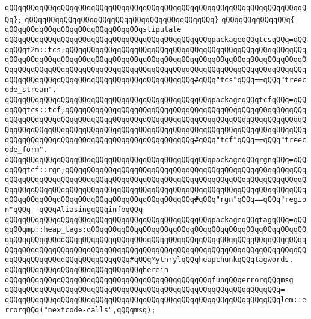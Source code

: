 \verb|qQQqqQQqqQQqqQQqqQQqqQQqqQQqqQQqqQQqqQQqqQQqqQQqqQQqqQQqqQQqqQQqqQQqqQQq};|\newline
\verb|qQQqqQQqqQQqqQQqqQQqqQQqqQQqqQQqqQQqqQQqqQQq}|\newline
\verb|qQQqqQQqqQQqqQQq{|\newline
\newline
\verb|qQQqqQQqqQQqqQQqqQQqqQQqqQQqqQQqstipulate|\newline
\verb|qQQqqQQqqQQqqQQqqQQqqQQqqQQqqQQqqQQqqQQqqQQqqQQqpackageqQQqtcsqQQq=qQQqqQQqt2m::tcs;qQQqqQQqqQQqqQQqqQQqqQQqqQQqqQQqqQQqqQQqqQQqqQQqqQQqqQQqqQQqqQQqqQQqqQQqqQQqqQQqqQQqqQQqqQQqqQQqqQQqqQQqqQQqqQQqqQQqqQQqqQQqqQQqqQQqqQQqqQQqqQQqqQQqqQQqqQQqqQQqqQQqqQQqqQQqqQQqqQQqqQQqqQQqqQQqqQQqqQQqqQQqqQQqqQQqqQQqqQQqqQQqqQQqqQQqqQQqqQQq#qQQq"tcs"qQQq==qQQq"treecode_stream".|\newline
\verb|qQQqqQQqqQQqqQQqqQQqqQQqqQQqqQQqqQQqqQQqqQQqqQQqpackageqQQqtcfqQQq=qQQqqQQqtcs::tcf;qQQqqQQqqQQqqQQqqQQqqQQqqQQqqQQqqQQqqQQqqQQqqQQqqQQqqQQqqQQqqQQqqQQqqQQqqQQqqQQqqQQqqQQqqQQqqQQqqQQqqQQqqQQqqQQqqQQqqQQqqQQqqQQqqQQqqQQqqQQqqQQqqQQqqQQqqQQqqQQqqQQqqQQqqQQqqQQqqQQqqQQqqQQqqQQqqQQqqQQqqQQqqQQqqQQqqQQqqQQqqQQqqQQqqQQqqQQqqQQq#qQQq"tcf"qQQq==qQQq"treecode_form".|\newline
\verb|qQQqqQQqqQQqqQQqqQQqqQQqqQQqqQQqqQQqqQQqqQQqqQQqpackageqQQqrgnqQQq=qQQqqQQqtcf::rgn;qQQqqQQqqQQqqQQqqQQqqQQqqQQqqQQqqQQqqQQqqQQqqQQqqQQqqQQqqQQqqQQqqQQqqQQqqQQqqQQqqQQqqQQqqQQqqQQqqQQqqQQqqQQqqQQqqQQqqQQqqQQqqQQqqQQqqQQqqQQqqQQqqQQqqQQqqQQqqQQqqQQqqQQqqQQqqQQqqQQqqQQqqQQqqQQqqQQqqQQqqQQqqQQqqQQqqQQqqQQqqQQqqQQqqQQqqQQqqQQq#qQQq"rgn"qQQq==qQQq"region"qQQq--qQQqAliasingqQQqinfoqQQq|\newline
\verb|qQQqqQQqqQQqqQQqqQQqqQQqqQQqqQQqqQQqqQQqqQQqqQQqpackageqQQqtagqQQq=qQQqqQQqmp::heap_tags;qQQqqQQqqQQqqQQqqQQqqQQqqQQqqQQqqQQqqQQqqQQqqQQqqQQqqQQqqQQqqQQqqQQqqQQqqQQqqQQqqQQqqQQqqQQqqQQqqQQqqQQqqQQqqQQqqQQqqQQqqQQqqQQqqQQqqQQqqQQqqQQqqQQqqQQqqQQqqQQqqQQqqQQqqQQqqQQqqQQqqQQqqQQqqQQqqQQqqQQqqQQqqQQqqQQqqQQqqQQq#qQQqMythrylqQQqheapchunkqQQqtagwords.|\newline
\verb|qQQqqQQqqQQqqQQqqQQqqQQqqQQqqQQqherein|\newline
\newline
\verb|qQQqqQQqqQQqqQQqqQQqqQQqqQQqqQQqqQQqqQQqqQQqqQQqfunqQQqerrorqQQqmsg|\newline
\verb|qQQqqQQqqQQqqQQqqQQqqQQqqQQqqQQqqQQqqQQqqQQqqQQqqQQqqQQqqQQqqQQq=|\newline
\verb|qQQqqQQqqQQqqQQqqQQqqQQqqQQqqQQqqQQqqQQqqQQqqQQqqQQqqQQqqQQqqQQqlem::errorqQQq("nextcode-calls",qQQqmsg);|\newline
